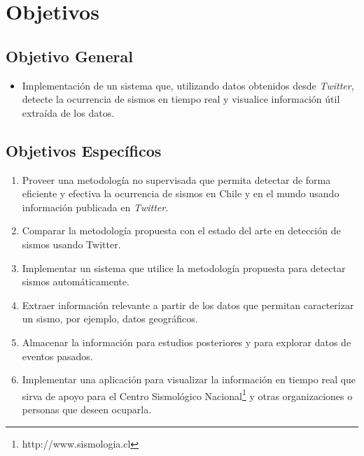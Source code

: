 \section{Objetivos}
\label{sec:objetivos}

\subsection{Objetivo General}
	
\begin{itemize}

\item Implementación de un sistema que, utilizando datos obtenidos desde \textit{Twitter}, detecte la ocurrencia de sismos en tiempo real y visualice información útil extraída de los datos.\\ 

\end{itemize}

\subsection{Objetivos Específicos}

\begin{enumerate}

\item Proveer una metodología no supervisada que permita detectar de forma eficiente y efectiva la ocurrencia de sismos en Chile y en el mundo usando información publicada en \textit{Twitter}.

\item Comparar la metodología propuesta con el estado del arte en detección de sismos usando Twitter. 

\item Implementar un sistema que utilice la metodología propuesta para detectar sismos automáticamente.

\item Extraer información relevante a partir de los datos que permitan caracterizar un sismo, por ejemplo, datos geográficos.

\item Almacenar la información para estudios posteriores y para explorar datos de eventos pasados.

\item Implementar una aplicación para visualizar la información en tiempo real que sirva de apoyo para el Centro Sismológico Nacional\footnote{http://www.sismologia.cl} y otras organizaciones o personas que deseen ocuparla.

\end{enumerate}


